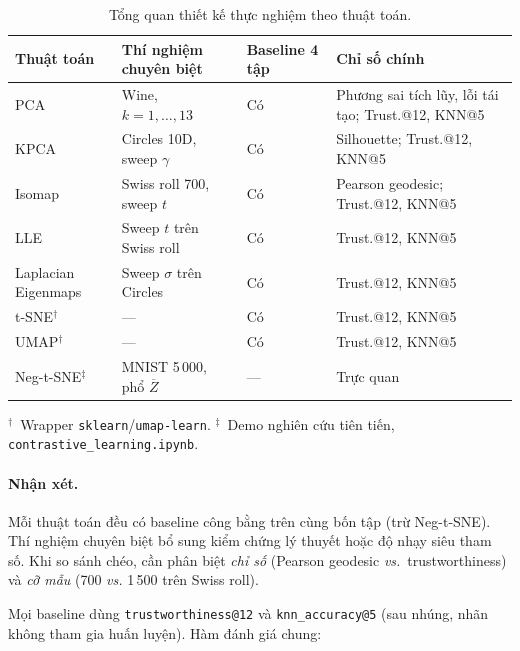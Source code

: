 \begin{table}[H]
  \centering
  \caption{Tổng quan thiết kế thực nghiệm theo thuật toán.}
  \label{tab:experiment-setup}
  \small
  \begin{tabular}{p{}p{}p{}p{}}
    \toprule
    Thuật toán & Thí nghiệm chuyên biệt & Baseline 4 tập & Chỉ số chính \\
    \midrule
    PCA & Wine, $k=1,\ldots,13$ & Có & Phương sai tích lũy, lỗi tái tạo; Trust.@12, KNN@5 \\
    KPCA & Circles 10D, sweep $\gamma$ & Có & Silhouette; Trust.@12, KNN@5 \\
    Isomap & Swiss roll 700, sweep $t$ & Có & Pearson geodesic; Trust.@12, KNN@5 \\
    LLE & Sweep $t$ trên Swiss roll & Có & Trust.@12, KNN@5 \\
    Laplacian Eigenmaps & Sweep $\sigma$ trên Circles & Có & Trust.@12, KNN@5 \\
    t-SNE$^\dagger$ & --- & Có & Trust.@12, KNN@5 \\
    UMAP$^\dagger$ & --- & Có & Trust.@12, KNN@5 \\
    Neg-t-SNE$^\ddagger$ & MNIST 5\,000, phổ $\overline{Z}$ & --- & Trực quan \\
    \bottomrule
  \end{tabular}
  \vspace{0.4em}
  {\footnotesize $^\dagger$~Wrapper \texttt{sklearn}/\texttt{umap-learn}.
  $^\ddagger$~Demo nghiên cứu tiên tiến, \texttt{contrastive\_learning.ipynb}.}
\end{table}

\paragraph{Nhận xét.}
Mỗi thuật toán đều có baseline công bằng trên cùng bốn tập (trừ Neg-t-SNE).
Thí nghiệm chuyên biệt bổ sung kiểm chứng lý thuyết hoặc độ nhạy siêu tham số.
Khi so sánh chéo, cần phân biệt \emph{chỉ số} (Pearson geodesic \emph{vs.}\
trustworthiness) và \emph{cỡ mẫu} (700 \emph{vs.} 1\,500 trên Swiss roll).

Mọi baseline dùng \texttt{trustworthiness@12} và \texttt{knn\_accuracy@5}
(sau nhúng, nhãn không tham gia huấn luyện). Hàm đánh giá chung:



